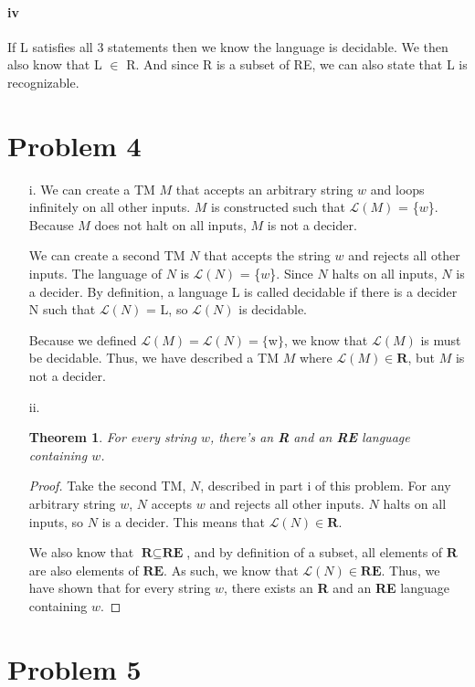 \documentclass[10pt,letter]{article}
\newtheorem*{thm}{Theorem}
\begin{document}
\paragraph{iv}
If L satisfies all 3 statements then we know the language is decidable. We then also know that L $\in$ R. And since R is a subset of RE, we can also state that L is recognizable. 
\section*{Problem 4}
\begin{enumerate}
\item[i. ] We can create a TM $M$ that accepts an arbitrary string $w$ and loops infinitely on all other inputs. $M$ is constructed such that $\mathscr{L}(M)$ = \{$w$\}. Because $M$ does not halt on all inputs, $M$ is not a decider. 

We can create a second TM $N$ that accepts the string $w$ and rejects all other inputs. The language of $N$ is $\mathscr{L}(N)$ = \{$w$\}. Since $N$ halts on all inputs, $N$ is a decider. By definition, a language L is called decidable if there is a decider N such that $\mathscr{L}(N)$ = L, so $\mathscr{L}(N)$ is decidable. 

Because we defined $\mathscr{L}(M) = \mathscr{L}(N) = \{$w$\}$, we know that $\mathscr{L}(M)$ is must be decidable. Thus, we have described a TM $M$ where $\mathscr{L}(M) \in \textbf{R}$, but $M$ is not a decider.

\item[ii. ] 
\begin{thm} For every string $w$, there's an \textbf{R} and an \textbf{RE} language containing $w$.\end{thm}
\begin{proof} Take the second TM, $N$, described in part i of this problem. For any arbitrary string $w$, $N$ accepts $w$ and rejects all other inputs. $N$ halts on all inputs, so $N$ is a decider. This means that $\mathscr{L}(N) \in \textbf{R}$. 

We also know that $\textbf{R} \subseteq \textbf{RE}$, and by definition of a subset, all elements of $\textbf{R}$ are also elements of $\textbf{RE}$. As such, we know that $\mathscr{L}(N) \in \textbf{RE}$. Thus, we have shown that for every string $w$, there exists an \textbf{R} and an \textbf{RE} language containing $w$.
\end{proof}
\end{enumerate}
\section*{Problem 5}
\end{document}
